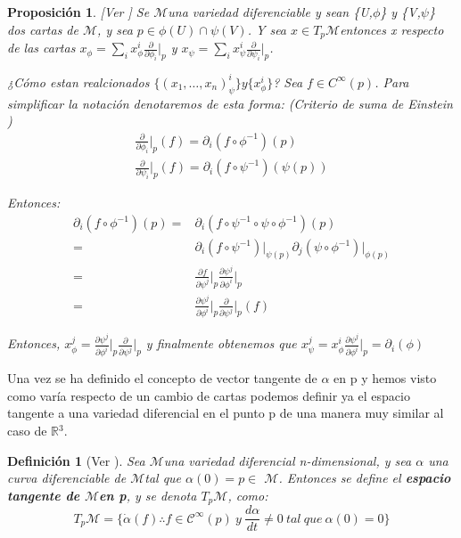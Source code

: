 \documentclass[pdftex,11pt,a4paper]{book}
\newtheorem{defi}{Definici\'on}
\newtheorem{propo}{Proposición}
\newcommand{\M}{$\mathscr{M}$}
\newcommand{\tpm}{$T_p\mathscr{M}$}
\newcommand{\R}{$\mathbb{R}$}
\newcommand{\x}{(x_1, \ldots,x_n)}
\begin{document}
\begin{propo}\label{cambio_componentes}
[Ver \cite{WinterSchool}]
Se \M una variedad diferenciable y sean \{U,$\phi$\} y \{V,$\psi$\} dos cartas de \M, y sea $p \in \phi(U)\cap \psi(V) $. Y sea $x \in $\tpm entonces x respecto de  las cartas $x_\phi = \sum_i x_\phi^i \frac{\partial}{\partial \phi_i}\bigg|_{p} $ y $x_\psi =\sum_i x_\psi^i \frac{\partial}{\partial \psi_i}\bigg|_{p} $.

¿Cómo estan realcionados $\{\x_\psi^i \} y \{x_\phi^i \} $?
Sea $f \in C^\infty(p) $. Para simplificar la notación denotaremos de esta forma: (Criterio de suma de Einstein )
\begin{equation}
    \begin{aligned}
           \frac{\partial}{\partial \phi_i}\bigg|_p (f)= \partial_i(f\circ \phi^{-1})(p) \\ 
   \frac{\partial }{\partial \psi_i }\bigg|_p (f)= \partial_i(f \circ \psi^{-1})(\psi(p)) 
    \end{aligned}
\end{equation}

Entonces:
\begin{equation}
 \begin{aligned}
      \partial_i(f\circ \phi^{-1})(p) = & \partial_i(f\circ \psi^{-1} \circ \psi  \circ \phi^{-1})(p) \\
     =& \partial_i(f \circ \psi^{-1})\bigg|_{\psi(p)}\partial_j(\psi \circ \phi^{-1} )\bigg|_{\phi(p)}\\
     =& \frac{\partial f}{\partial \psi^j}\bigg|_p\frac{\partial \psi^j}{\partial \phi^i}\bigg|_p \\
     =&\frac{\partial \psi^j}{\partial \phi^i}\bigg|_p\frac{\partial }{\partial \psi^j}\bigg|_p(f) 
\end{aligned}   
\end{equation}


Entonces, $x_{\phi}^j =\frac{\partial \psi^j}{\partial \phi^i}\bigg|_p \frac{\partial }{\partial \psi^j}\bigg|_p $ y finalmente obtenemos que $x_\psi^j = x_\phi^i \frac{\partial \psi^j}{\partial \phi^i} \bigg|_p = \partial_i(\phi)$ 
\end{propo}

Una vez se ha definido el concepto de vector tangente de $\alpha$ en p y hemos visto como varía respecto de un cambio de cartas podemos definir ya el espacio tangente a una variedad diferencial en el punto p de una manera muy similar al caso de \R$^3$.

\begin{defi} [Ver \cite{DoCarmoRiemann}]
Sea \M una variedad diferencial n-dimensional, y sea $\alpha$ una curva diferenciable de \M tal que $\alpha(0)= p \in$ \M . Entonces se define el \textbf{espacio tangente de \M en p}, y se denota \tpm, como: 
\begin{equation}
   T_p\mathscr{M}= \{\dot{\alpha}(f)\therefore f \in \mathscr{C}^\infty(p)\ y \ \frac{d \alpha}{dt} \neq 0 \ tal \ que \  \alpha(0)=0\}
\end{equation}
\end{defi}
\end{document}
